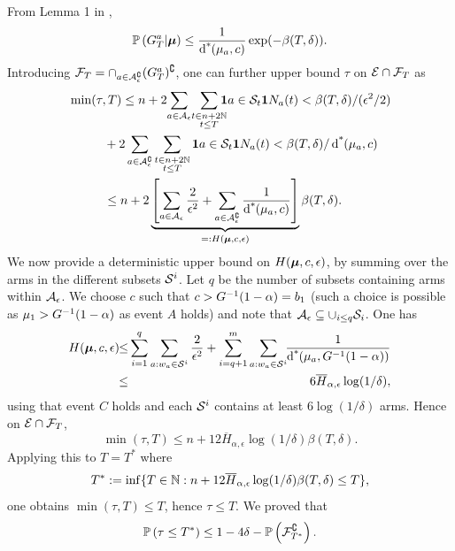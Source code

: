 From Lemma 1 in \cite{COLT13},
\begin{align}
\mathbb{P}\left(  G_T^a | \bm{\mu}  \right)
	\leq \frac{1}{\operatorname{d^*}\hspace{-.2em}\left( \mu_a, c \right)}\exp(-\beta(T,\delta)).\label{boundE1}
\end{align}
Introducing $\mathcal{F}_T = \cap_{a \in \mathcal{A}_{\epsilon}^\complement} (G_T^a)^\complement$, one can further upper bound $\tau$ on $\mathcal{E} \cap \mathcal{F}_T$ as 
\begin{align*}
& \min(\tau,T)   \le  n + 2\!\sum_{a \in \EpsCheapArms}\!\sum_{\substack{t  \in n + 2\N\\t \leq T}}\!\!\!\! \1{a \in \ArmGrpEmp{t}}\1{N_a(t) < \beta(T,\delta)/(\epsilon^2/2)}\\
&  \hspace{1cm}+  2\sum_{a \in \EpsCheapArms^\complement} \sum_{\substack{t  \in n + 2\N\\t \leq T}} \1{a \in \ArmGrpEmp{t}}\1{N_a(t) < \beta(T,\delta)/\ArmCI{\ArmMean_a}{c}} \\
& \hspace{1cm} \le  n + 2\underbrace{\left[\sum_{a \in \EpsCheapArms} \frac{2}{\epsilon^2} + \sum_{a \in \EpsCheapArms^\complement}\frac{1}{\ArmCI{\ArmMean_a}{c}}\right]}_{=: H(\bm\ArmMean,c,\epsilon)}\beta(T,\delta).
\end{align*}
We now provide a deterministic upper bound on $H(\bm{\mu},c,\epsilon)$, by summing over the arms in the different subsets $\mathcal{S}^{i}$.
Let $q$ be the number of subsets containing arms within $\mathcal{A}_{\epsilon}$.
We choose $c$ such that $c>G^{-1}(1-\alpha) = b_1$ (such a choice is possible as $\mu_1 >G^{-1}(1-\alpha)$ as event $A$ holds) and note that
	$\mathcal{A}_{\epsilon} \subseteq \cup_{i\le q} \mathcal{S}_{i}$.
One has 
\begin{eqnarray*}
H(\bm \ArmMean,c,\epsilon)
	\!\!& \leq &\!\!\!\!\!
	\sum_{i=1}^q
	\sum_{a : \arm_a \in \ArmGrp{i}} \frac{2}{\epsilon^2}
	+
	\sum_{i=q+1}^m
	\sum_{a : \arm_a \in \ArmGrp{i}}
	\!\!\frac{1}{\ArmCI{\ArmMean_a}{\ExpRewardInvCDF(1-\alpha)}}  \\
& \leq &\!\! 6 \overline{H}_{\alpha,\epsilon}\log(1/\delta),
\end{eqnarray*}
using that event $C$ holds and each $\mathcal{S}^{i}$ contains at least $6\log(1/\delta)$ arms. Hence on $\mathcal{E} \cap \mathcal{F}_T$, 
\[\min(\tau,T)   \le n + 12 \overline{H}_{\alpha,\epsilon}\log(1/\delta) \beta(T,\delta).\]
Applying this to  $T=T^*$ where 
\[T^* := \inf\{ T \in \mathbb{N} : n + 12 \overline{H}_{\alpha,\epsilon}\log(1/\delta) \beta(T,\delta) \leq T\},\]
one obtains $\min(\tau,T) \leq T$, hence $\tau \leq T$. We proved that 
\begin{align*}
\mathbb{P}\left(  \tau \leq T^*  \right)
	\leq 1 - 4\delta - \mathbb{P}\left(  \mathcal{F}_{T^*}^\complement  \right).
\end{align*}

